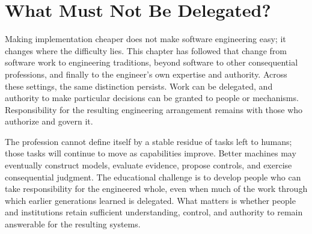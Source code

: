 



\chapter{What Must Not Be Delegated?}

Making implementation cheaper does not make software engineering easy; it changes where the difficulty lies. This chapter has followed that change from software work to engineering traditions, beyond software to other consequential professions, and finally to the engineer’s own expertise and authority. Across these settings, the same distinction persists. Work can be delegated, and authority to make particular decisions can be granted to people or mechanisms. Responsibility for the resulting engineering arrangement remains with those who authorize and govern it.


The profession cannot define itself by a stable residue of tasks left to humans; those tasks will continue to move as capabilities improve. Better machines may eventually construct models, evaluate evidence, propose controls, and exercise consequential judgment. The educational challenge is to develop people who can take responsibility for the engineered whole, even when much of the work through which earlier generations learned is delegated. What matters is whether people and institutions retain sufficient understanding, control, and authority to remain answerable for the resulting systems.
